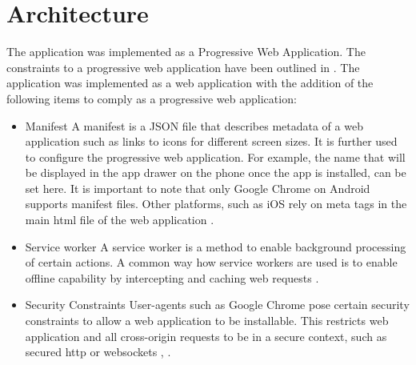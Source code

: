 \section{Architecture\label{architecture}}
The application was implemented as a Progressive Web Application. The constraints to a progressive web application have been outlined in \cite{undefined}. The application was implemented as a web application with the addition of the following items to comply as a progressive web application:
\begin{itemize}
\item Manifest
A manifest is a JSON file that describes metadata of a web application such as links to icons for different screen sizes. It is further used to configure the progressive web application. For example, the name that will be displayed in the app drawer on the phone once the app is installed, can be set here. It is important to note that only Google Chrome on Android supports manifest files. \cite{manifest} Other platforms, such as iOS rely on meta tags in the main html file of the web application \cite{applemetatags}. 
\item Service worker
A service worker is a method to enable background processing of certain actions. A common way how service workers are used is to enable offline capability by intercepting and caching web requests \cite{serviceworkers}.
\item Security Constraints
User-agents such as Google Chrome pose certain security constraints to allow a web application to be installable. This restricts web application and all cross-origin requests to be in a secure context, such as secured http or websockets \cite{manifest}, \cite{securitychrome}.
\end{itemize}

